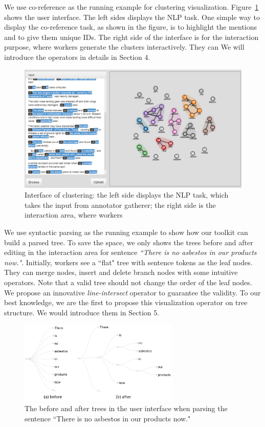 We use co-reference as the running example for clustering visualization. Figure~\ref{fig:interface1.png} shows the user interface. The left sides displays the NLP task. One simple way to display the co-reference task, as shown in the figure, is to highlight the mentions and to give them unique IDs. The right side of the interface is for the interaction purpose, where workers generate the clusters interactively. They can We will introduce the operators in details in Section 4.
\begin{figure}
\centering
\includegraphics[width=6.1in]{figs/interface1.png}
\caption{Interface of clustering: the left side displays the NLP task, which takes the input from annotator gatherer; the right side is the interaction area, where workers}
\label{fig:interface1.png}
\end{figure}

We use syntactic parsing as the running example to show how our toolkit can build a parsed tree. To save the space, we only shows the trees before and after editing in the interaction area for sentence {\em ``There is no asbestos in our products now."}. Initially, workers see a ``flat" tree with sentence tokens as the leaf nodes. They can merge nodes, insert and delete branch nodes with some intuitive operators. Note that a valid tree should not change the order of the leaf nodes. We propose an innovative {\em line-intersect} operator to guarantee the validity. To our best knowledge, we are the first to propose this visualization operator on tree structure. We would introduce them in Section 5.

\begin{figure}
\centering
\includegraphics[width=3in]{figs/overview_tree_editing.png}
\caption{The before and after trees in the user interface when parsing the sentence {``There is no asbestos in our products now."}}
\label{fig:interface2.png}
\end{figure}

